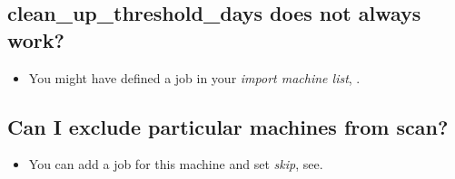 \subsection*{clean\_up\_threshold\_days does not always work?}
\begin{itemize}
\item You might have defined a job in your \emph{import machine list}, .
\end{itemize}

\subsection*{Can I exclude particular machines from scan?}
\begin{itemize}
\item You can add a job for this machine and set \emph{skip}, see.
\end{itemize}
